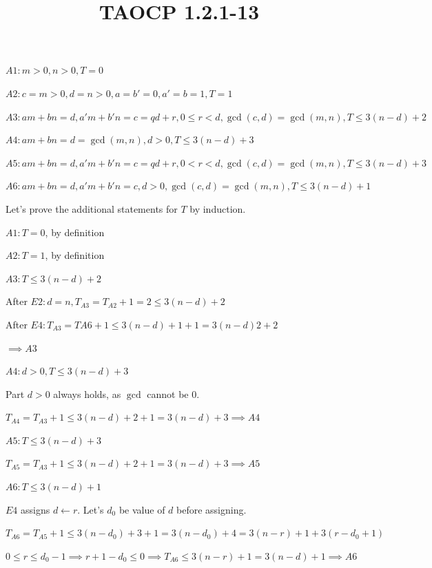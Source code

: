 \documentclass{article}
\title{TAOCP 1.2.1\mbox{-}13}
\begin{document}
\maketitle

\( A1: m > 0, n > 0, T = 0 \)

\( A2: c = m > 0, d = n > 0, a = b' = 0, a' = b = 1, T = 1 \)

\( A3: am + bn = d, a'm + b'n = c = qd + r, 0 \leq r < d, \gcd(c, d) = \gcd(m, n), T \leq 3(n-d) + 2 \)

\( A4: am + bn = d = \gcd(m, n), d > 0, T \leq 3(n - d) + 3 \)

\( A5: am + bn = d, a'm + b'n = c = qd + r, 0 < r < d, \gcd(c, d) = \gcd(m, n), T \leq 3(n-d) + 3 \)

\( A6: am + bn = d, a'm + b'n = c, d > 0, \gcd(c, d) = \gcd(m, n), T \leq 3(n-d) + 1 \)

Let's prove the additional statements for \( T \) by induction.

\( A1: T = 0 \), by definition

\( A2: T=1 \), by definition

\( A3: T \leq 3(n-d)+2 \)

After \( E2: d=n, T_{A3}=T_{A2} + 1 = 2 \leq 3(n-d) + 2 \)

After \( E4: T_{A3} = T{A6} + 1 \leq 3(n-d)+1+1 = 3(n-d)2 + 2 \)

\( \implies A3 \)

\( A4: d > 0, T \leq 3(n-d)+3 \)

Part \( d > 0 \) always holds, as \( \gcd \) cannot be \( 0 \).

\( T_{A4} = T_{A3} + 1 \leq 3(n - d)+2 + 1 = 3(n-d)+3 \implies A4 \)

\( A5: T \leq 3(n-d) + 3 \)

\( T_{A5} = T_{A3} + 1 \leq 3(n - d)+2 + 1 = 3(n-d)+3 \implies A5 \)

\( A6: T \leq 3(n-d)+1 \)

\( E4 \) assigns \( d \leftarrow r \). Let's \( d_{0} \) be value of \( d \) before assigning.

\( T_{A6} = T_{A5} + 1 \leq 3(n-d_{0})+3+1 = 3(n-d_{0})+4 = 3(n-r)+1+3(r-d_{0}+1) \)

\( 0 \leq r \leq d_{0} - 1 \implies r + 1 - d_{0} \leq 0 \implies T_{A6} \leq 3(n-r)+1 = 3(n-d)+1 \implies A6 \)
\end{document}
